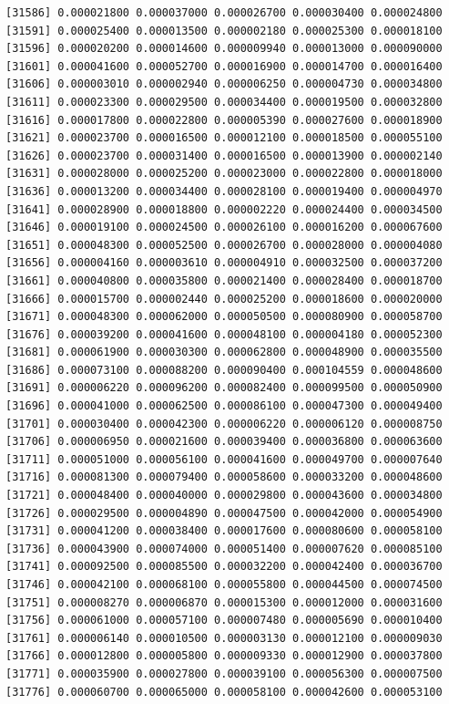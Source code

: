 \documentclass[]{article}
\begin{document}
\begin{verbatim}
[31586] 0.000021800 0.000037000 0.000026700 0.000030400 0.000024800
[31591] 0.000025400 0.000013500 0.000002180 0.000025300 0.000018100
[31596] 0.000020200 0.000014600 0.000009940 0.000013000 0.000090000
[31601] 0.000041600 0.000052700 0.000016900 0.000014700 0.000016400
[31606] 0.000003010 0.000002940 0.000006250 0.000004730 0.000034800
[31611] 0.000023300 0.000029500 0.000034400 0.000019500 0.000032800
[31616] 0.000017800 0.000022800 0.000005390 0.000027600 0.000018900
[31621] 0.000023700 0.000016500 0.000012100 0.000018500 0.000055100
[31626] 0.000023700 0.000031400 0.000016500 0.000013900 0.000002140
[31631] 0.000028000 0.000025200 0.000023000 0.000022800 0.000018000
[31636] 0.000013200 0.000034400 0.000028100 0.000019400 0.000004970
[31641] 0.000028900 0.000018800 0.000002220 0.000024400 0.000034500
[31646] 0.000019100 0.000024500 0.000026100 0.000016200 0.000067600
[31651] 0.000048300 0.000052500 0.000026700 0.000028000 0.000004080
[31656] 0.000004160 0.000003610 0.000004910 0.000032500 0.000037200
[31661] 0.000040800 0.000035800 0.000021400 0.000028400 0.000018700
[31666] 0.000015700 0.000002440 0.000025200 0.000018600 0.000020000
[31671] 0.000048300 0.000062000 0.000050500 0.000080900 0.000058700
[31676] 0.000039200 0.000041600 0.000048100 0.000004180 0.000052300
[31681] 0.000061900 0.000030300 0.000062800 0.000048900 0.000035500
[31686] 0.000073100 0.000088200 0.000090400 0.000104559 0.000048600
[31691] 0.000006220 0.000096200 0.000082400 0.000099500 0.000050900
[31696] 0.000041000 0.000062500 0.000086100 0.000047300 0.000049400
[31701] 0.000030400 0.000042300 0.000006220 0.000006120 0.000008750
[31706] 0.000006950 0.000021600 0.000039400 0.000036800 0.000063600
[31711] 0.000051000 0.000056100 0.000041600 0.000049700 0.000007640
[31716] 0.000081300 0.000079400 0.000058600 0.000033200 0.000048600
[31721] 0.000048400 0.000040000 0.000029800 0.000043600 0.000034800
[31726] 0.000029500 0.000004890 0.000047500 0.000042000 0.000054900
[31731] 0.000041200 0.000038400 0.000017600 0.000080600 0.000058100
[31736] 0.000043900 0.000074000 0.000051400 0.000007620 0.000085100
[31741] 0.000092500 0.000085500 0.000032200 0.000042400 0.000036700
[31746] 0.000042100 0.000068100 0.000055800 0.000044500 0.000074500
[31751] 0.000008270 0.000006870 0.000015300 0.000012000 0.000031600
[31756] 0.000061000 0.000057100 0.000007480 0.000005690 0.000010400
[31761] 0.000006140 0.000010500 0.000003130 0.000012100 0.000009030
[31766] 0.000012800 0.000005800 0.000009330 0.000012900 0.000037800
[31771] 0.000035900 0.000027800 0.000039100 0.000056300 0.000007500
[31776] 0.000060700 0.000065000 0.000058100 0.000042600 0.000053100

\end{verbatim}
\end{document}
